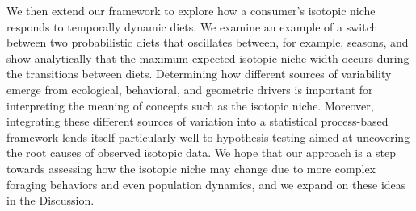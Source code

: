 \documentclass{frontiersSCNS}
\begin{document}
We then extend our framework to explore how a consumer's isotopic niche responds to temporally dynamic diets.
We examine an example of a switch between two probabilistic diets that oscillates between, for example, seasons, and show analytically that the maximum expected isotopic niche width occurs during the transitions between diets.
Determining how different sources of variability emerge from ecological, behavioral, and geometric drivers is important for interpreting the meaning of concepts such as the isotopic niche.
Moreover, integrating these different sources of variation into a statistical process-based framework lends itself particularly well to hypothesis-testing aimed at uncovering the root causes of observed isotopic data.
We hope that our approach is a step towards assessing how the isotopic niche may change due to more complex foraging behaviors and even population dynamics, and we expand on these ideas in the Discussion.



%





\end{document}
